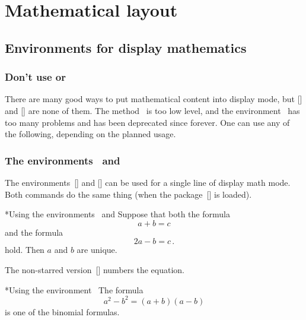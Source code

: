 \chapter{Mathematical layout}





\section{Environments for display mathematics}
\label{display environments}



\subsection{Don’t use \inlinecodetitle{\$\$  \$\$} or }

There are many good ways to put mathematical content into display mode, but \inlinecode{\$\$~\$\$}[\inlinecode] and [\envname] are none of them.
The method~\inlinecode{\$\$  \$\$} is too low level, and the environment~ has too many problems and has been deprecated since forever.
One can use any of the following, depending on the planned usage.



\subsection{The environments~\inlinecodetitle{{\tbs}[ {\tbs}]} and }

The environments~\inlinecode{{\tbs}[ {\tbs}]}[\inlinecode] and [\envname] can be used for a single line of display math mode.
Both commands do the same thing (when the package~[\packname] is loaded).
\begin{showlatex}*{Using the environments~\inlinecode{{\tbs}[ {\tbs}]} and }
Suppose that both the formula
\[
  a + b = c
\]
and the formula
\begin{equation*}
  2a - b = c \,.
\end{equation*}
hold.
Then $a$ and $b$ are unique.
\end{showlatex}
The non-starred version~[\envname] numbers the equation.
\begin{showlatex}*{Using the environment~}
The formula
\begin{equation}
  a^2 - b^2 = (a + b)(a - b)
\end{equation}
is one of the binomial formulas.
\end{showlatex}



